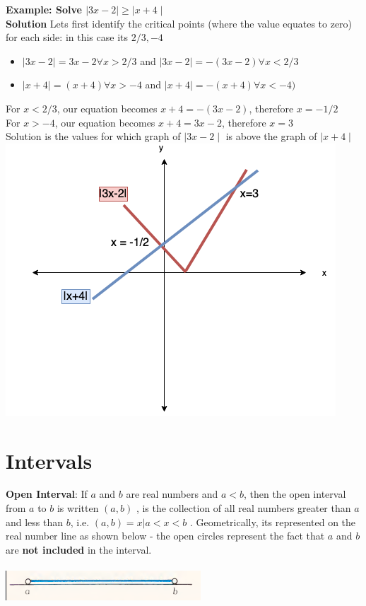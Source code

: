 \documentclass{book}
\begin{document}
\begin{mdframed}[backgroundcolor=yellow]	
	\textbf{Example: Solve $\mid 3x-2 \mid \geq \mid x + 4 \mid$} \\
	\textbf{Solution}
	Lets first identify the critical points (where the value equates to zero) for each side: in this case its $2/3, -4$
	\begin{itemize}
		\item $\mid 3x-2 \mid = {3x-2} \forall x > 2/3$ and $\mid 3x-2 \mid = -(3x-2) \forall x < 2/3$
		\item $\mid x + 4 \mid = (x+4) \forall x > {-4}$ and $\mid x + 4 \mid = -(x+4) \forall x < -4)$
	\end{itemize}
	
	
	For $x < 2/3$, our equation becomes $x + 4 = -(3x-2)$, therefore $x=-1/2$ \\
	For $x > -4$, our equation becomes $x+4 = 3x-2$, therefore $x=3$ \\
	
	Solution is the values for which graph of $\mid 3x-2 \mid$ is above the graph of $\mid x+4 \mid$ \\
	
	\includegraphics[scale=0.5]{solution1}
	
	
\end{mdframed}

	\section{Intervals}
	\textbf{Open Interval}:  If $a$ and $b$ are real numbers and $a<b$,  then the open interval from $a$ to $b$ is written $(a,b)$ , is the collection of all real numbers greater than $a$ and less than $b$, i.e. $(a,b) = {{x | a<x<b}}$ . Geometrically, its represented on the real number line as shown below - the open circles represent the fact that $a$ and $b$ are \textbf{not included} in the interval. \\
	\\
	\includegraphics[scale=0.5]{openinterval}
	\\
	
\end{document}
